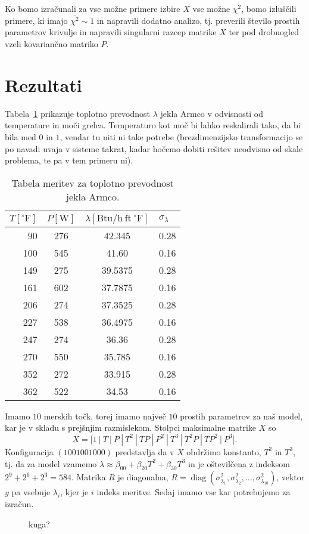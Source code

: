 \documentclass[a4 paper, 12pt]{article}
\newcommand{\diag}{
	\operatorname{diag}
}
\begin{document}
Ko bomo izra\v cunali za vse mo\v zne primere izbire $X$ vse mo\v zne $\chi^2$, bomo izlu\v s\v cili primere, ki imajo
$\overline{\chi^2} \sim 1$ in napravili dodatno analizo, tj. preverili \v stevilo prostih parametrov krivulje in
napravili singularni razcep matrike $X$ ter pod drobnogled vzeli kovarian\v cno matriko $P$.

\section{Rezultati}

Tabela~\ref{tab1} prikazuje toplotno prevodnost $\lambda$ jekla Armco v odvisnosti od temperature in mo\v ci grelca.
Temperaturo kot mo\v c bi lahko reskalirali tako, da bi bila med $0$ in $1$, vendar tu niti ni take potrebe
(brezdimenzijsko transformacijo se po navadi uvaja v sisteme takrat, kadar ho\v cemo dobiti re\v sitev neodvisno od
skale problema, te pa v tem primeru ni).

\begin{table}[H]\centering
	\caption{Tabela meritev za toplotno prevodnost jekla Armco.}
	\begin{tabular}{r|c|c|l}
		$T [^\circ\mathrm{F}]$ & $P[\mathrm{W}]$ & $\lambda[\mathrm{Btu/h\ ft\ {}^\circ F}]$ & $\sigma_{\lambda}$ \\
		\hline
		90  & 276 & 42.345  & 0.28 \\
		100 & 545 & 41.60   & 0.16 \\
		149 & 275 & 39.5375 & 0.28 \\
		161 & 602 & 37.7875 & 0.16 \\
		206 & 274 & 37.3525 & 0.28 \\
		227 & 538 & 36.4975 & 0.16 \\
		247 & 274 & 36.36   & 0.28 \\
		270 & 550 & 35.785  & 0.16 \\
		352 & 272 & 33.915  & 0.28 \\
		362 & 522 & 34.53   & 0.16
	\end{tabular}
	\label{tab1}
\end{table}

Imamo $10$ merskih to\v ck, torej imamo najve\v c $10$ prostih parametrov za na\v s model, kar je v skladu s prej\v snjim
razmislekom. Stolpci maksimalne matrike $X$ so
\[
	X = \Big[1\ |\ T\ |\ P\ |\ T^2\ |\ TP\ |\ P^2\ |\ T^3\ |\ T^2P\ |\ TP^2\ |\ P^3 \Big].
\]
Konfiguracija $(1001001000)$ predstavlja da v $X$ obdr\v zimo konstanto, $T^2$ in $T^3$, tj. da za model vzamemo
$\lambda \approx \beta_{00} + \beta_{20} T^2 + \beta_{30} T^3$ in je o\v stevil\v cena z indeksom $2^9 + 2^6 + 2^3 = 584$.
Matrika $R$ je diagonalna, $R = \diag(\sigma_{\lambda_1}^2, \sigma_{\lambda_2}^2, \ldots, \sigma_{\lambda_{10}}^2)$,
vektor $y$ pa vsebuje $\lambda_i$, kjer je $i$ indeks meritve. Sedaj imamo vse kar potrebujemo za izra\v cun.

\begin{figure}[H]
	
	\caption{kuga?}
\end{figure}
\end{document}
